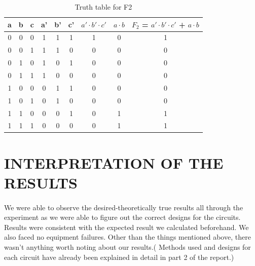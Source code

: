 \documentclass[pdftex,12pt,a4paper]{article}
\begin{document}
\begin{flushleft}
\begin{table}[!h]
\centering
\begin{tabular}{|c|c|c|c|c|c|c|c|c|}
\hline
a & b & c & a' & b' & c' & $a' \cdot b' \cdot c'$ & $a \cdot b$ & $F_{2}$ = $a' \cdot b' \cdot c'$ + $a \cdot b$      \\ \hline
0 & 0 & 0 & 1  & 1  & 1  & 1             & 0      & 1             \\ \hline
0 & 0 & 1 & 1  & 1  & 0  & 0             & 0      & 0               \\ \hline
0 & 1 & 0 & 1  & 0  & 1  & 0             & 0      & 0              \\ \hline
0 & 1 & 1 & 1  & 0  & 0  & 0             & 0      & 0               \\ \hline
1 & 0 & 0 & 0  & 1  & 1  & 0             & 0      & 0               \\ \hline
1 & 0 & 1 & 0  & 1  & 0  & 0             & 0      & 0           \\ \hline
1 & 1 & 0 & 0  & 0  & 1  & 0             & 1      & 1          \\ \hline
1 & 1 & 1 & 0  & 0  & 0  & 0             & 1      & 1               \\ \hline
\end{tabular}
\caption{Truth table for F2}
\label{fig3}
\end{table}


\end{flushleft}


\newpage
\section{INTERPRETATION OF THE RESULTS }
\begin{flushleft}
\paragraph{}
We were able to observe the desired-theoretically true results all through the experiment as we were able to figure out the correct designs for the circuits. Results were consistent with the expected result we calculated beforehand. We also faced no equipment failures. Other than the things mentioned above, there wasn't anything worth noting about our results.( Methods used and designs for each circuit have already been explained in detail in part 2 of the report.)

\end{flushleft}
\end{document}
